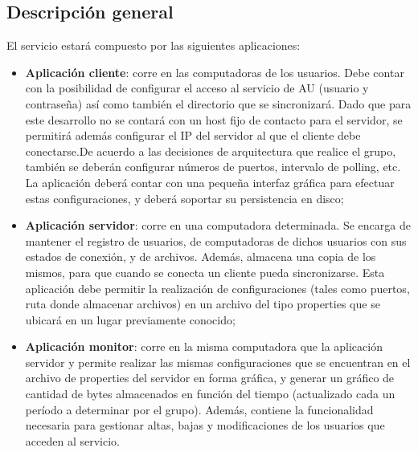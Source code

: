 \documentclass{article}
\begin{document}
\subsection{Descripción general}
\smallskip

	El servicio estará compuesto por las siguientes aplicaciones:
	\smallskip

	\begin{itemize}
	\itemsep=8pt \topsep=0pt \partopsep=0pt \parskip=0pt \parsep=0pt

		\item \textbf{Aplicación cliente}: corre en las computadoras de los usuarios. Debe contar con la posibilidad de configurar el acceso al servicio de AU (usuario y contraseña) así como también el directorio que se sincronizará. Dado que para este desarrollo no se contará con un host fijo de contacto para el servidor, se permitirá además configurar el IP del servidor al que el cliente debe conectarse.De acuerdo a las decisiones de arquitectura que realice el grupo, también se deberán configurar números de puertos, intervalo de polling, etc. La aplicación deberá contar con una pequeña interfaz gráfica para efectuar estas configuraciones, y deberá soportar su persistencia en disco;

		\item \textbf{Aplicación servidor}: corre en una computadora determinada. Se encarga de mantener el registro de usuarios, de computadoras de dichos usuarios con sus estados de conexión, y de archivos. Además, almacena una copia de los mismos, para que cuando se conecta un cliente pueda sincronizarse. Esta aplicación debe permitir la realización de configuraciones (tales como puertos, ruta donde almacenar archivos) en un archivo del tipo properties que se ubicará en un lugar previamente conocido;

		\item \textbf{Aplicación monitor}: corre en la misma computadora que la aplicación servidor y permite realizar las mismas configuraciones que se encuentran en el archivo de properties del servidor en forma gráfica, y generar un gráfico de cantidad de bytes almacenados en función del tiempo (actualizado cada un período a determinar por el grupo). Además, contiene la funcionalidad necesaria para gestionar altas, bajas y modificaciones de los usuarios que acceden al servicio.

	\end{itemize}
\bigskip
\end{document}
